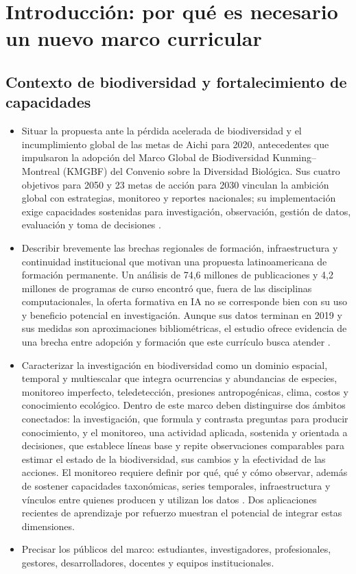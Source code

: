 \documentclass[11pt,a4paper]{article}
\begin{document}
\section{Introducción: por qué es necesario un nuevo marco curricular}

\subsection{Contexto de biodiversidad y fortalecimiento de capacidades}

\begin{itemize}
  \item Situar la propuesta ante la pérdida acelerada de biodiversidad y el
  incumplimiento global de las metas de Aichi para 2020, antecedentes que
  impulsaron la adopción del Marco Global de Biodiversidad Kunming--Montreal
  (KMGBF) del Convenio sobre la Diversidad Biológica. Sus cuatro objetivos para
  2050 y 23 metas de acción para 2030 vinculan la ambición global con estrategias,
  monitoreo y reportes nacionales; su implementación exige capacidades sostenidas
  para investigación, observación, gestión de datos, evaluación y toma de
  decisiones \citep{affinito2024monitoring,affinito2025coverage}.
  \item Describir brevemente las brechas regionales de formación, infraestructura
  y continuidad institucional que motivan una propuesta latinoamericana de
  formación permanente. Un análisis de 74,6 millones de publicaciones y 4,2
  millones de programas de curso encontró que, fuera de las disciplinas
  computacionales, la oferta formativa en IA no se corresponde bien con su uso y
  beneficio potencial en investigación. Aunque sus datos terminan en 2019 y sus
  medidas son aproximaciones bibliométricas, el estudio ofrece evidencia de una
  brecha entre adopción y formación que este currículo busca atender
  \citep{gao2024quantifying}.
 \item Caracterizar la investigación en biodiversidad como un dominio espacial, 
 temporal y multiescalar que integra ocurrencias y abundancias de especies, monitoreo 
 imperfecto, teledetección, presiones antropogénicas, clima, costos y conocimiento ecológico. 
 Dentro de este marco deben distinguirse dos ámbitos conectados: la investigación, que formula 
 y contrasta preguntas para producir conocimiento, y el monitoreo, una actividad aplicada, 
 sostenida y orientada a decisiones, que establece líneas base y repite observaciones comparables 
 para estimar el estado de la biodiversidad, sus cambios y la efectividad de las acciones. El monitoreo 
 requiere definir por qué, qué y cómo observar, además de sostener capacidades taxonómicas, series
 temporales, infraestructura y vínculos entre quienes producen y utilizan los datos \citep{paton2009biodiversity,buckland2005monitoring}. 
 Dos aplicaciones recientes de aprendizaje por refuerzo muestran el potencial de integrar estas dimensiones.
  \item Precisar los públicos del marco: estudiantes, investigadores,
  profesionales, gestores, desarrolladores, docentes y equipos institucionales.
\end{itemize}
\end{document}
